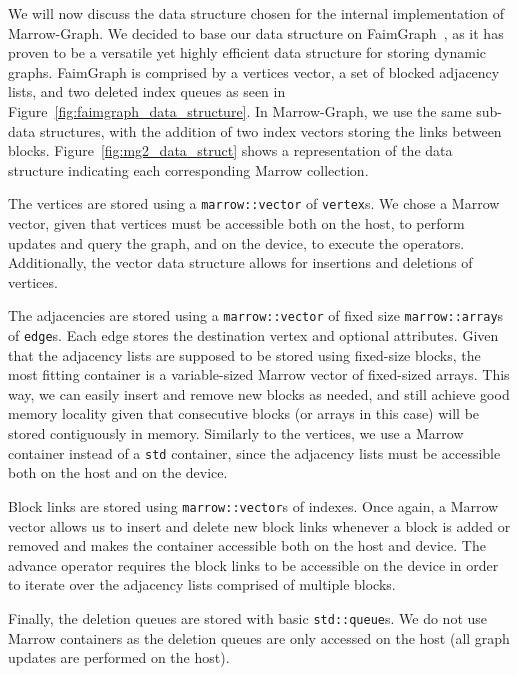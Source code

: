 
We will now discuss the data structure chosen for the internal implementation of Marrow-Graph. We decided to base our data structure on FaimGraph~\cite{paper:faimgraph}, as it has proven to be a versatile yet highly efficient data structure for storing dynamic graphs. FaimGraph is comprised by a vertices vector, a set of blocked adjacency lists, and two deleted index queues as seen in Figure~\ref{fig:faimgraph_data_structure}. In Marrow-Graph, we use the same sub-data structures, with the addition of two index vectors storing the links between blocks. Figure~\ref{fig:mg2_data_struct} shows a representation of the data structure indicating each corresponding Marrow collection.  

The vertices are stored using a \texttt{marrow::vector} of \texttt{vertex}s. We chose a Marrow vector, given that vertices must be accessible both on the host, to perform updates and query the graph, and on the device, to execute the operators. Additionally, the vector data structure allows for insertions and deletions of vertices. 

The adjacencies are stored using a \texttt{marrow::vector} of fixed size \texttt{marrow::array}s of \texttt{edge}s. Each edge stores the destination vertex and optional attributes. Given that the adjacency lists are supposed to be stored using fixed-size blocks, the most fitting container is a variable-sized Marrow vector of fixed-sized arrays. This way, we can easily insert and remove new blocks as needed, and still achieve good memory locality given that consecutive blocks (or arrays in this case) will be stored contiguously in memory. Similarly to the vertices, we use a Marrow container instead of a \texttt{std} container, since the adjacency lists must be accessible both on the host and on the device.

Block links are stored using \texttt{marrow::vector}s of indexes. Once again, a Marrow vector allows us to insert and delete new block links whenever a block is added or removed and makes the container accessible both on the host and device. The advance operator requires the block links to be accessible on the device in order to iterate over the adjacency lists comprised of multiple blocks.

Finally, the deletion queues are stored with basic \texttt{std::queue}s. We do not use Marrow containers as the deletion queues are only accessed on the host (all graph updates are performed on the host). 


